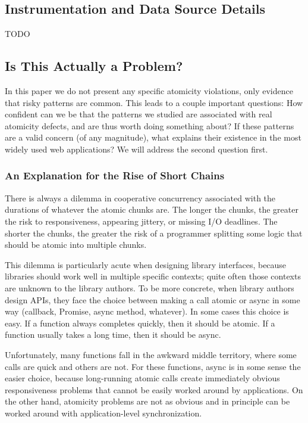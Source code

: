 \documentclass[acmsmall,anonymous,review]{acmart}\settopmatter{printfolios=true,printccs=false,printacmref=false}
\begin{document}
\subsection{Instrumentation and Data Source Details}

TODO

\subsection{Is This Actually a Problem?}

In this paper we do not present any specific atomicity violations, only evidence that risky patterns are common.
This leads to a couple important questions:
How confident can we be that the patterns we studied are associated with real atomicity defects, and are thus worth doing something about?
If these patterns are a valid concern (of any magnitude), what explains their existence in the most widely used web applications?
We will address the second question first.

\subsubsection{An Explanation for the Rise of Short Chains}

There is always a dilemma in cooperative concurrency associated with the durations of whatever the atomic chunks are.
The longer the chunks, the greater the risk to responsiveness, appearing jittery, or missing I/O deadlines.
The shorter the chunks, the greater the risk of a programmer splitting some logic that should be atomic into multiple chunks.

This dilemma is particularly acute when designing library interfaces, because libraries should work well in multiple specific contexts; quite often those contexts are unknown to the library authors.
To be more concrete, when library authors design APIs, they face the choice between making a call atomic or async in some way (callback, Promise, async method, whatever).
In some cases this choice is easy.
If a function always completes quickly, then it should be atomic.
If a function usually takes a long time, then it should be async.

Unfortunately, many functions fall in the awkward middle territory, where some calls are quick and others are not.
For these functions, async is in some sense the easier choice, because long-running atomic calls create immediately obvious responsiveness problems that cannot be easily worked around by applications.
On the other hand, atomicity problems are not as obvious and in principle can be worked around with application-level synchronization.
\end{document}
